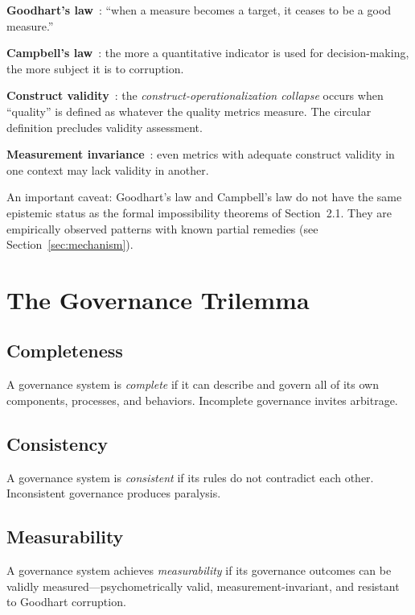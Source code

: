 \documentclass[12pt,a4paper]{article}
\begin{document}
\textbf{Goodhart's law}~\cite{Goodhart1975,Strathern1997}: ``when a measure
becomes a target, it ceases to be a good measure.''

\textbf{Campbell's law}~\cite{Campbell1979}: the more a quantitative indicator
is used for decision-making, the more subject it is to corruption.

\textbf{Construct validity}~\cite{Messick1989,CronbachMeehl1955}: the
\emph{construct-operationalization collapse} occurs when ``quality'' is defined
as whatever the quality metrics measure. The circular definition precludes
validity assessment.

\textbf{Measurement invariance}~\cite{Meredith1993}: even metrics with
adequate construct validity in one context may lack validity in another.

An important caveat: Goodhart's law and Campbell's law do not have the same
epistemic status as the formal impossibility theorems of
Section~2.1. They are empirically observed patterns with known partial
remedies (see Section~\ref{sec:mechanism}).

\section{The Governance Trilemma}

\subsection{Completeness}

A governance system is \emph{complete} if it can describe and govern all of
its own components, processes, and behaviors. Incomplete governance invites
arbitrage.

\subsection{Consistency}

A governance system is \emph{consistent} if its rules do not contradict each
other. Inconsistent governance produces paralysis.

\subsection{Measurability}

A governance system achieves \emph{measurability} if its governance outcomes
can be validly measured---psychometrically valid, measurement-invariant, and
resistant to Goodhart corruption.
\end{document}

